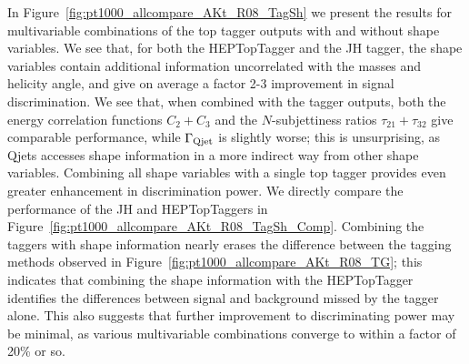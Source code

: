 In Figure~\ref{fig:pt1000_allcompare_AKt_R08_TagSh} we present the results for multivariable combinations of the top tagger outputs with and without shape variables. We see that, for both the HEPTopTagger and the JH tagger, the shape variables contain additional information uncorrelated with the masses and helicity angle, and give on average a factor 2-3 improvement in signal discrimination. We see that, when combined with the tagger outputs, both the energy correlation functions $C_2+C_3$ and the $N$-subjettiness ratios $\tau_{21}+\tau_{32}$ give comparable performance, while $\Gamma_{\rm Qjet}$ is slightly worse; this is unsurprising, as Qjets accesses shape information in a more indirect way from other shape variables. Combining all shape variables with a single top tagger provides even greater enhancement in discrimination power. We directly compare the performance of the JH and HEPTopTaggers in Figure~\ref{fig:pt1000_allcompare_AKt_R08_TagSh_Comp}. Combining the taggers with shape information nearly erases the difference between the tagging methods observed in Figure~\ref{fig:pt1000_allcompare_AKt_R08_TG}; this indicates that combining the shape information with the HEPTopTagger identifies the differences between signal and background missed by the tagger alone. This also suggests that further improvement to discriminating power may be minimal, as various multivariable combinations converge to within a factor of 20\% or so.


